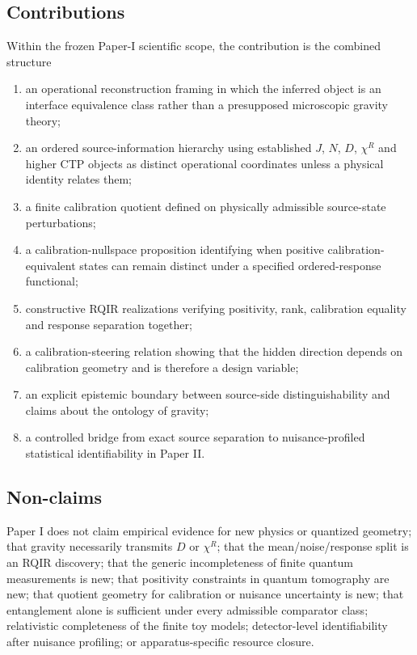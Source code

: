 \documentclass[11pt]{article}
\begin{document}
\subsection{Contributions}

Within the frozen Paper-I scientific scope, the contribution is the combined structure
\begin{enumerate}
  \item an operational reconstruction framing in which the inferred object is an interface equivalence class rather than a presupposed microscopic gravity theory;
  \item an ordered source-information hierarchy using established $J$, $N$, $D$, $\chi^R$ and higher CTP objects as distinct operational coordinates unless a physical identity relates them;
  \item a finite calibration quotient defined on physically admissible source-state perturbations;
  \item a calibration-nullspace proposition identifying when positive calibration-equivalent states can remain distinct under a specified ordered-response functional;
  \item constructive RQIR realizations verifying positivity, rank, calibration equality and response separation together;
  \item a calibration-steering relation showing that the hidden direction depends on calibration geometry and is therefore a design variable;
  \item an explicit epistemic boundary between source-side distinguishability and claims about the ontology of gravity;
  \item a controlled bridge from exact source separation to nuisance-profiled statistical identifiability in Paper II.
\end{enumerate}

\subsection{Non-claims}

Paper I does not claim empirical evidence for new physics or quantized geometry; that gravity necessarily transmits $D$ or $\chi^R$; that the mean/noise/response split is an RQIR discovery; that the generic incompleteness of finite quantum measurements is new; that positivity constraints in quantum tomography are new; that quotient geometry for calibration or nuisance uncertainty is new; that entanglement alone is sufficient under every admissible comparator class; relativistic completeness of the finite toy models; detector-level identifiability after nuisance profiling; or apparatus-specific resource closure.
\end{document}

